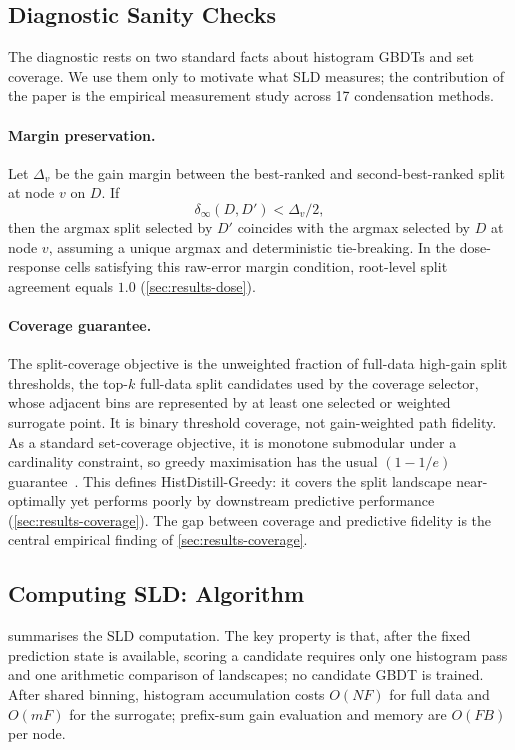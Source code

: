 \subsection{Diagnostic Sanity Checks}

The diagnostic rests on two standard facts about histogram GBDTs and set
coverage. We use them only to motivate what SLD measures; the contribution of
the paper is the empirical measurement study across 17 condensation methods.

\paragraph{Margin preservation.}
Let $\Delta_v$ be the gain margin between the best-ranked and second-best-ranked
split at node $v$ on $D$. If
%
\begin{equation}
  \label{eq:prop1}
  \delta_\infty(D, D') < \Delta_v / 2,
\end{equation}
%
then the argmax split selected by $D'$ coincides with the argmax selected by $D$
at node $v$, assuming a unique argmax and deterministic tie-breaking. In the
dose-response cells satisfying this raw-error margin condition, root-level split
agreement equals $1.0$ (\cref{sec:results-dose}).

\paragraph{Coverage guarantee.}
The split-coverage objective is the unweighted fraction of full-data high-gain
split thresholds, the top-$k$ full-data split candidates used by the coverage
selector, whose adjacent bins are represented by at least one selected or
weighted surrogate point. It is binary threshold coverage, not gain-weighted
path fidelity. As a standard set-coverage objective, it is monotone submodular
under a cardinality constraint, so greedy maximisation has the usual
$(1 - 1/e)$ guarantee~\cite{nemhauser1978submodular}. This defines
HistDistill-Greedy: it covers the split landscape near-optimally yet performs
poorly by downstream predictive performance
(\cref{sec:results-coverage}). The gap between coverage and predictive fidelity is the
central empirical finding of \cref{sec:results-coverage}.

\subsection{Computing SLD: Algorithm}

 summarises the SLD computation. The key property is that, after
the fixed prediction state is available, scoring a candidate requires only one
histogram pass and one arithmetic comparison of landscapes; no candidate GBDT is
trained. After shared binning, histogram accumulation costs $O(NF)$ for full
data and $O(mF)$ for the surrogate; prefix-sum gain evaluation and memory are
$O(FB)$ per node.

